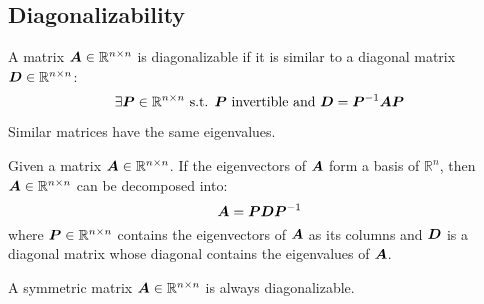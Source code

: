 \subsection{Diagonalizability}
A matrix ${\bm{A}} \in \mathbb{R}^{n \times n}$ is diagonalizable if it is similar to a diagonal matrix ${\bm{D}} \in \mathbb{R}^{n \times n}$:
\[ \exists {\bm{P}} \in \mathbb{R}^{n \times n} \text{ s.t. } {\bm{P}} \text{ invertible and } {\bm{D}} = {\bm{P}}^{-1}{\bm{A}}{\bm{P}} \]

\begin{theorem}
    Similar matrices have the same eigenvalues.
\end{theorem}

\begin{theorem}[Eigendecomposition] 
    Given a matrix ${\bm{A}} \in \mathbb{R}^{n \times n}$.
    If the eigenvectors of ${\bm{A}}$ form a basis of $\mathbb{R}^n$,
    then ${\bm{A}} \in \mathbb{R}^{n \times n}$ can be decomposed into:
    \[ {\bm{A}} = {\bm{P}}{\bm{D}}{\bm{P}}^{-1} \]
    where ${\bm{P}} \in \mathbb{R}^{n \times n}$ contains the eigenvectors of ${\bm{A}}$ as its columns and 
    ${\bm{D}}$ is a diagonal matrix whose diagonal contains the eigenvalues of ${\bm{A}}$.
\end{theorem}

\begin{theorem} 
    A symmetric matrix ${\bm{A}} \in \mathbb{R}^{n \times n}$ is always diagonalizable.
\end{theorem}